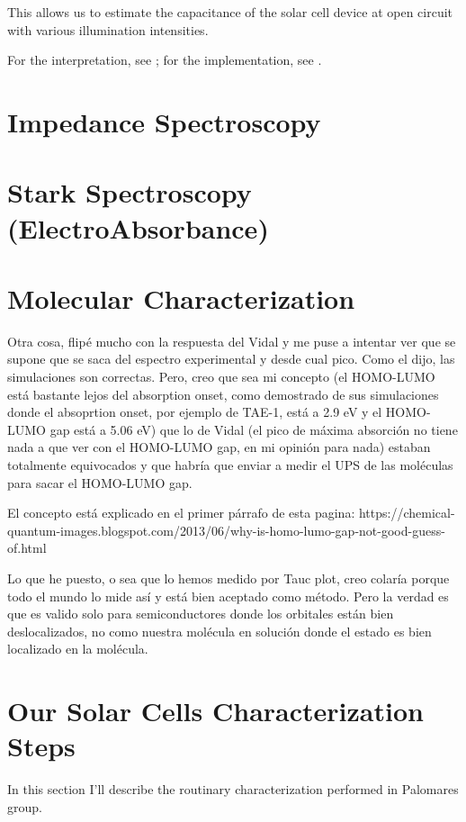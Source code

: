 This allows us to estimate the capacitance of the solar cell device at open circuit with various illumination intensities.

For the interpretation, see ; for the implementation, see .

\section{Impedance Spectroscopy}

\section{Stark Spectroscopy (ElectroAbsorbance)}

\section{Molecular Characterization}

Otra cosa, flipé mucho con la respuesta del Vidal y me puse a intentar
ver que se supone que se saca del espectro experimental y desde cual
pico. Como el dijo, las simulaciones son correctas.
Pero, creo que sea mi concepto (el HOMO-LUMO está bastante lejos del
absorption onset, como demostrado de sus simulaciones donde el
absoprtion onset, por ejemplo de TAE-1, está a 2.9 eV y el HOMO-LUMO gap
está a 5.06 eV) que lo de Vidal (el pico de máxima absorción no tiene
nada a que ver con el HOMO-LUMO gap, en mi opinión para nada) estaban
totalmente equivocados y que habría que enviar a medir el UPS de las
moléculas para sacar el HOMO-LUMO gap.

El concepto está explicado en el primer párrafo de esta pagina:
https://chemical-quantum-images.blogspot.com/2013/06/why-is-homo-lumo-gap-not-good-guess-of.html

Lo que he puesto, o sea que lo hemos medido por Tauc plot, creo colaría
porque todo el mundo lo mide así y está bien aceptado como método. Pero
la verdad es que es valido solo para semiconductores donde los orbitales
están bien deslocalizados, no como nuestra molécula en solución donde el
estado es bien localizado en la molécula.

\section{Our Solar Cells Characterization Steps}

In this section I'll describe the routinary characterization performed in Palomares group.


